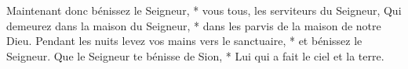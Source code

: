 Maintenant donc bénissez le Seigneur, * vous tous, les serviteurs du Seigneur,
\versseparator
Qui demeurez dans la maison du Seigneur, * dans les parvis de la maison de notre Dieu.
\versseparator
Pendant les nuits levez vos mains vers le sanctuaire, * et bénissez le Seigneur.
\versseparator
Que le Seigneur te bénisse de Sion, * Lui qui a fait le ciel et la terre.